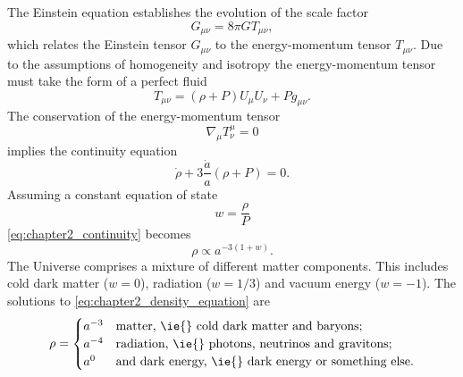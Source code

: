 The Einstein equation establishes the evolution of the scale factor
%
\begin{equation}\label{eq:chapter2_einstein_tensor}
	G_{\mu\nu}
	= 8\pi G T_{\mu\nu},
\end{equation}
%
which relates the Einstein tensor \(G_{\mu\nu}\) to the energy-momentum tensor \(T_{\mu\nu}\).
Due to the assumptions of homogeneity and isotropy the energy-momentum tensor must take the form of a perfect fluid
%
\begin{equation}\label{eq:chapter2_energy_momentum}
	T_{\mu\nu}
	= (\rho + P) U_{\mu} U_{\nu} + P g_{\mu\nu}.
\end{equation}
%
The conservation of the energy-momentum tensor
%
\begin{equation}
	\nabla_{\mu} T^{\mu}_{\nu}
	= 0
\end{equation}
%
implies the continuity equation
%
\begin{equation}\label{eq:chapter2_continuity}
	\dot{\rho} + 3\frac{\dot{a}}{a}(\rho + P)
	= 0.
\end{equation}
%
Assuming a constant equation of state
%
\begin{equation}
	w
	= \frac{\rho}{P}
\end{equation}
%
\cref{eq:chapter2_continuity} becomes
%
\begin{equation}\label{eq:chapter2_density_equation}
	\rho
	\propto a^{-3(1+w)}.
\end{equation}
%
The Universe comprises a mixture of different matter components.
This includes cold dark matter (\(w=0\)), radiation (\(w=1/3\)) and vacuum energy (\(w=-1\)).
The solutions to \cref{eq:chapter2_density_equation} are
%
\begin{equation}
	\rho =
	\begin{cases}
		a^{-3} & \text{matter, \ie{} cold dark matter and baryons};           \\
		a^{-4} & \text{radiation, \ie{} photons, neutrinos and gravitons};    \\
		a^{0}  & \text{and dark energy, \ie{} dark energy or something else}.
	\end{cases}
\end{equation}

